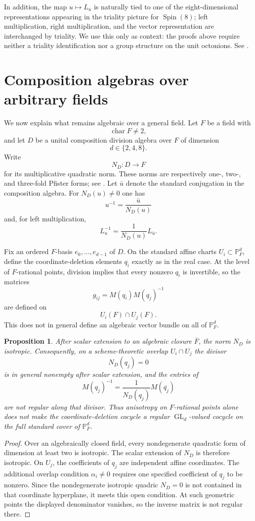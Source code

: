 \documentclass[12pt]{article}
\theoremstyle{plain}
\newtheorem{proposition}[theorem]{Proposition}
\theoremstyle{definition}
\newcommand{\PP}{\mathbb P}
\newcommand{\GL}{\operatorname{GL}}
\newcommand{\charac}{\operatorname{char}}
\begin{document}
In addition, the map $u\mapsto L_u$ is naturally tied to one of the eight-dimensional
representations appearing in the triality picture for $\operatorname{Spin}(8)$; left
multiplication, right multiplication, and the vector representation are
interchanged by triality. We use this only as context: the proofs above
require neither a triality identification nor a group structure on the
unit octonions. See \cite{Baez}.

\section{Composition algebras over arbitrary fields}
\label{sec:arbitrary-field}

We now explain what remains algebraic over a general field. Let $F$ be
a field with
\[
\charac F\ne2,
\]
and let $D$ be a unital composition division algebra over $F$ of
dimension
\[
d\in\{2,4,8\}.
\]
Write
\[
N_D:D\longrightarrow F
\]
for its multiplicative quadratic norm. These norms are respectively
one-, two-, and three-fold Pfister forms; see
\cite{Lam,SpringerVeldkamp}. Let $\bar u$ denote the standard
conjugation in the composition algebra. For $N_D(u)\ne0$ one has
\[
u^{-1}=\frac{\bar u}{N_D(u)}
\]
and, for left multiplication,
\[
L_u^{-1}=\frac{1}{N_D(u)}L_{\bar u}.
\]

Fix an ordered $F$-basis $e_0,\ldots,e_{d-1}$ of $D$. On the standard
affine charts $U_i\subset\PP^d_F$, define the coordinate-deletion
elements $q_i$ exactly as in the real case. At the level of
$F$-rational points, division implies that every nonzero $q_i$ is
invertible, so the matrices
\[
g_{ij}=M(q_i)M(q_j)^{-1}
\]
are defined on
\[
U_i(F)\cap U_j(F).
\]
This does not in general define an algebraic vector bundle on all of
$\PP^d_F$.

\begin{proposition}
	\label{prop:scheme-obstruction}
	After scalar extension to an algebraic closure $\overline F$, the norm
	$N_D$ is isotropic. Consequently, on a scheme-theoretic overlap
	$U_i\cap U_j$ the divisor
	\[
	N_D(q_j)=0
	\]
	is in general nonempty after scalar extension, and the entries of
	\[
	M(q_j)^{-1}
	=\frac{1}{N_D(q_j)}M(\overline{q_j})
	\]
	are not regular along that divisor. Thus anisotropy on $F$-rational
	points alone does not make the coordinate-deletion cocycle a regular
	$\GL_d$-valued cocycle on the full standard cover of $\PP^d_F$.
\end{proposition}

\begin{proof}
	Over an algebraically closed field, every nondegenerate quadratic form
	of dimension at least two is isotropic. The scalar extension of
	$N_D$ is therefore isotropic. On $U_j$, the coefficients of $q_j$ are
	independent affine coordinates. The additional overlap condition
	$\alpha_i\ne0$ requires one specified coefficient of $q_j$ to be
	nonzero. Since the nondegenerate isotropic quadric $N_D=0$ is not
	contained in that coordinate hyperplane, it meets this open condition.
	At such geometric points the displayed denominator vanishes, so the
	inverse matrix is not regular there.
\end{proof}
\end{document}
